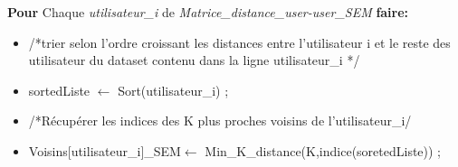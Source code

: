\begin{algorithm}[H]
\begin{itemize}
		\end{itemize}
	
	
	 \textbf{Pour} Chaque \textit{utilisateur{\_}i} de \textit{ Matrice{\_}distance{\_}user-user{\_}SEM} \textbf{faire:} 
	
	\begin{itemize}
		\item [] /*trier selon l'ordre croissant les distances entre l'utilisateur i et le reste des utilisateur du dataset contenu dans la ligne utilisateur{\_}i */
		\item []	sortedListe $\leftarrow$ Sort(utilisateur{\_}i) ;
		\item []	/*Récupérer les indices des K plus proches voisins de l'utilisateur{\_}i/
		\item [] Voisins[utilisateur{\_}i]{\_}SEM$\leftarrow$ Min{\_}K{\_}distance(K,indice(soretedListe)) ;
		
	\end{itemize}

\end{algorithm} 

